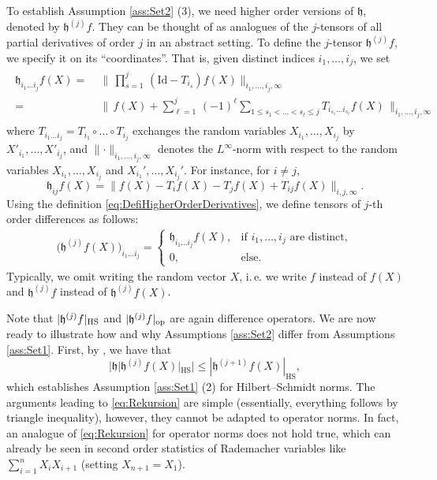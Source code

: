\documentclass[a4paper,12pt]{amsart}
\numberwithin{equation}{section}
\theoremstyle{remark}
\DeclarePairedDelimiter	{\abs}		{\lvert}	{\rvert}
\begin{document}
To establish Assumption \ref{ass:Set2} (3), we need higher order versions of $\mathfrak{h}$, denoted by $\mathfrak{h}^{(j)} f$. They can be thought of as analogues of the $j$-tensors of all partial derivatives of order $j$ in an abstract setting. To define the $j$-tensor $\mathfrak{h}^{(j)} f$, we specify it on its ``coordinates''. That is, given distinct indices $i_1, \ldots, i_j$, we set
\begin{align} 		\label{eq:DefiHigherOrderDerivatives}
	\begin{split}
		\mathfrak{h}_{i_1 \ldots i_j}f(X) 
		= \; &
		\Big\lVert\, \prod_{s=1}^j\, 
		(\mathrm{Id} - T_{i_s})f(X) \Big\rVert_{i_1, \ldots, i_j, \infty}\\
		= \; &
		\Big\lVert\, f(X) + \sum_{\ell=1}^j\, (-1)^\ell \sum_{1 \leq s_1 < \ldots < s_\ell \leq j}
		T_{i_{s_1} \ldots i_{s_\ell}}f(X)\, \Big\rVert_{i_1, \ldots, i_j, \infty}
	\end{split}
\end{align}
where $T_{i_1 \ldots i_j} = T_{i_1} \circ \ldots \circ T_{i_j}$ exchanges the random variables $X_{i_1}, \ldots, X_{i_j}$ by $X'_{i_1}, \ldots, X'_{i_j}$, and 
$\lVert \cdot \rVert_{i_1, \ldots, i_j, \infty}$ denotes the $L^\infty$-norm with respect to the random variables $X_{i_1}, \ldots, X_{i_j}$ and $X_{i_1}', \ldots, X_{i_j}'$. For instance, for $i \ne j$,  
\[
\mathfrak{h}_{ij} f(X) = \lVert f(X) - T_if(X) - T_jf(X) + T_{ij}f(X) \rVert_{i,j,\infty}.
\]
Using the definition \eqref{eq:DefiHigherOrderDerivatives}, we define tensors of $j$-th order differences as follows:
\begin{align*} %
	\big(\mathfrak{h}^{(j)}f(X)\big)_{i_1 \ldots i_j} = 
	\begin{cases} 
		\mathfrak{h}_{i_1 \ldots i_j}f(X), & 
		\text{if $i_1, \ldots, i_j$ are distinct}, \\ 0, & \text{else}. 
	\end{cases}
\end{align*}
Typically, we omit writing the random vector $X$, i.\,e. we write $f$ instead of $f(X)$ and $\mathfrak{h}^{(j)}f$ instead of $\mathfrak{h}^{(j)}f(X)$.

Note that $\abs{\mathfrak{h}^{(j)} f}_\mathrm{HS}$ and $\abs{\mathfrak{h}^{(j)} f}_\mathrm{op}$ are again difference operators. We are now ready to illustrate how and why Assumptions \ref{ass:Set2} differ from Assumptions \ref{ass:Set1}. First, by \cite[Le.\ 2.2]{BGS19}, we have that
\begin{equation}
	\label{eq:Rekursion}
	|\mathfrak{h}|\mathfrak{h}^{(j)}f(X)|_\mathrm{HS}| \le |\mathfrak{h}^{(j+1)}f(X)|_\mathrm{HS},
\end{equation}
which establishes Assumption \ref{ass:Set1} (2) for Hilbert--Schmidt norms. The arguments leading to \eqref{eq:Rekursion} are simple (essentially, everything follows by triangle inequality), however, they cannot be adapted to operator norms. In fact, an analogue of \eqref{eq:Rekursion} for operator norms does not hold true, which can already be seen in second order statistics of Rademacher variables like $\sum_{i=1}^{n} X_iX_{i+1}$ (setting $X_{n+1} = X_1$).
\end{document}
